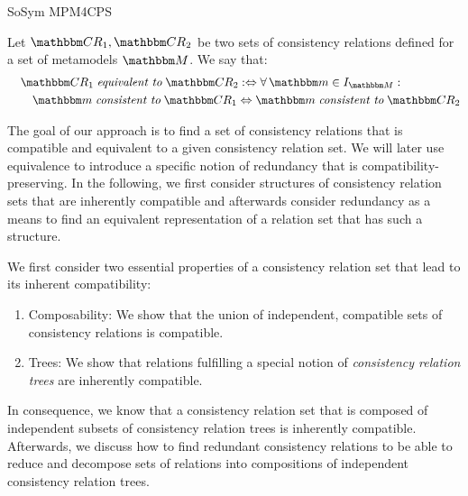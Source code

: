 \begin{copiedFrom}{SoSym MPM4CPS}
\begin{definition}
\label{def:equivalence}
    Let $\consistencyrelationset{CR}_{1}, \consistencyrelationset{CR}_{2}$ be two sets of consistency relations defined for a set of metamodels $\metamodelset{M}$. %
    We say that:
    \begin{align*}
        \formulaskip
        &
        \consistencyrelationset{CR}_{1} \equivalenttomath \consistencyrelationset{CR}_{2} \equivalentperdefinition \forall \modelset{m} \in \metamodelinstances{\metamodelset{M}} : \\
        & \formulaskip%
        \modelset{m} \consistenttomath \consistencyrelationset{CR}_{1} \equivalent \modelset{m} \consistenttomath \consistencyrelationset{CR}_{2}
    \end{align*}
\end{definition}


The goal of our approach is to find a set of consistency relations that is compatible and equivalent to a given consistency relation set.
We will later use equivalence to introduce a specific notion of redundancy that is compatibility-preserving.
In the following, we first consider structures of consistency relation sets that are inherently compatible and afterwards consider redundancy as a means to find an equivalent representation of a relation set that has such a structure.

We first consider two essential properties of a consistency relation set that lead to its inherent compatibility:
\begin{enumerate}
    \item Composability: We show that the union of independent, compatible sets of consistency relations is compatible.
    \item Trees: We show that relations fulfilling a special notion of \emph{consistency relation trees} are inherently compatible.
\end{enumerate}
In consequence, we know that a consistency relation set that is composed of independent subsets of consistency relation trees is inherently compatible.
Afterwards, we discuss how to find redundant consistency relations to be able to reduce and decompose sets of relations into compositions of independent consistency relation trees.



\end{copiedFrom}
